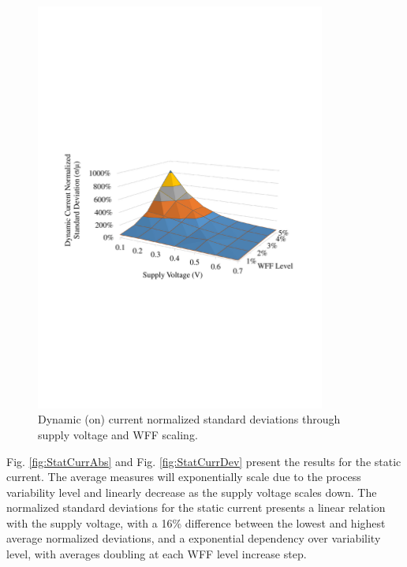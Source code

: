 \documentclass[diss,pgmicro,english]{iiufrgs}
\begin{document}
    \begin{figure}[H]
        \centering
            \includegraphics[width=0.85\textwidth, trim={1.25cm 9cm 2cm 10.5cm}, clip]{dynamicCurrDev.pdf}
            \caption{Dynamic (on) current normalized standard deviations through supply voltage and WFF scaling.}
        \label{fig:dynCurrDev}
    \end{figure}

Fig. \ref{fig:StatCurrAbs} and Fig. \ref{fig:StatCurrDev} present the results for the static current. The average measures will exponentially scale due to the process variability level and linearly decrease as the supply voltage scales down. The normalized standard deviations for the static current presents a linear relation with the supply voltage, with a 16\% difference between the lowest and highest average normalized deviations, and a exponential dependency over variability level, with averages doubling at each WFF level increase step.
\end{document}
